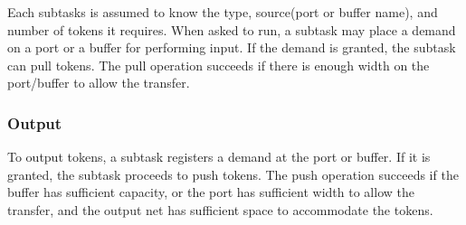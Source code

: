	Each subtasks is assumed to know the type, source(port or buffer name),
	and number of tokens it requires. When asked to run, a subtask may 
	place a demand on a port or a buffer for performing input. 
	If the demand is granted, the subtask can pull tokens. The pull operation
	succeeds if there is enough width on the port/buffer to allow the transfer.

	\subsubsection{Output}
	To output tokens, a subtask registers a demand at
	the port or buffer. If it is granted, the subtask proceeds to 
	push tokens. The push operation succeeds if
	the buffer has sufficient capacity, or the port has sufficient width to allow the transfer, 
	and the output net has	sufficient space to accommodate the tokens.






